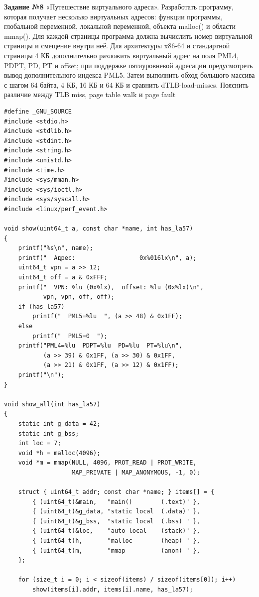 \textbf{Задание №8} «Путешествие виртуального адреса». Разработать программу, которая получает несколько
виртуальных адресов: функции программы, глобальной переменной, локальной переменной,
объекта malloc() и области mmap(). Для каждой страницы программа должна вычислить номер
виртуальной страницы и смещение внутри неё. Для архитектуры x86-64 и стандартной
страницы 4 КБ дополнительно разложить виртуальный адрес на поля PML4, PDPT, PD, PT и
offset; при поддержке пятиуровневой адресации предусмотреть вывод дополнительного индекса
PML5. Затем выполнить обход большого массива с шагом 64 байта, 4 КБ, 16 КБ и 64 КБ и
сравнить dTLB-load-misses. Пояснить различие между TLB miss, page table walk и page fault \label{sec:8}

\begin{verbatim}
#define _GNU_SOURCE
#include <stdio.h>
#include <stdlib.h>
#include <stdint.h>
#include <string.h>
#include <unistd.h>
#include <time.h>
#include <sys/mman.h>
#include <sys/ioctl.h>
#include <sys/syscall.h>
#include <linux/perf_event.h>

void show(uint64_t a, const char *name, int has_la57)
{
    printf("%s\n", name);
    printf("  Адрес:                  0x%016lx\n", a);
    uint64_t vpn = a >> 12;
    uint64_t off = a & 0xFFF;
    printf("  VPN: %lu (0x%lx),  offset: %lu (0x%lx)\n",
           vpn, vpn, off, off);
    if (has_la57)
        printf("  PML5=%lu  ", (a >> 48) & 0x1FF);
    else
        printf("  PML5=0  ");
    printf("PML4=%lu  PDPT=%lu  PD=%lu  PT=%lu\n",
           (a >> 39) & 0x1FF, (a >> 30) & 0x1FF,
           (a >> 21) & 0x1FF, (a >> 12) & 0x1FF);
    printf("\n");
}

void show_all(int has_la57)
{
    static int g_data = 42;
    static int g_bss;
    int loc = 7;
    void *h = malloc(4096);
    void *m = mmap(NULL, 4096, PROT_READ | PROT_WRITE,
                   MAP_PRIVATE | MAP_ANONYMOUS, -1, 0);

    struct { uint64_t addr; const char *name; } items[] = {
        { (uint64_t)&main,   "main()        (.text)" },
        { (uint64_t)&g_data, "static local  (.data)" },
        { (uint64_t)&g_bss,  "static local  (.bss) " },
        { (uint64_t)&loc,    "auto local    (stack)" },
        { (uint64_t)h,       "malloc        (heap) " },
        { (uint64_t)m,       "mmap          (anon) " },
    };

    for (size_t i = 0; i < sizeof(items) / sizeof(items[0]); i++)
        show(items[i].addr, items[i].name, has_la57);


\end{verbatim}
